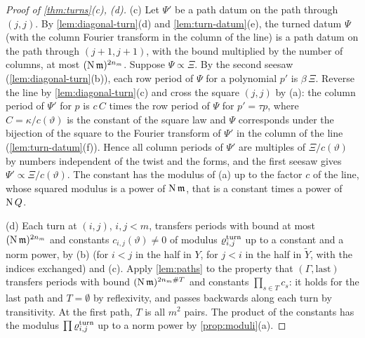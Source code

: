 \begin{proof}[Proof of \cref{thm:turns}(c), (d)]
(c) Let $\Psi'$ be a path datum on the path through $(j,j)$. By \cref{lem:diagonal-turn}(d) and \cref{lem:turn-datum}(e), the turned datum $\Psi$ (with the column Fourier transform in the column of the line) is a path datum on the path through
$(j+1,j+1)$, with the bound multiplied by the number of columns, at most $(\operatorname{N}\mathfrak m)^{2n_m}$. Suppose $\Psi\propto\Xi$. By the second seesaw (\cref{lem:diagonal-turn}(b)), each row period of $\Psi$ for a polynomial $p'$ is $\beta\,\Xi$. Reverse the
line by \cref{lem:diagonal-turn}(c) and cross the square $(j,j)$ by (a): the column period of $\Psi'$ for $p$ is $c\,C$ times the row period of $\Psi$ for $p'=\tau p$, where $C=\kappa/c(\vartheta)$ is the constant of the square law and $\Psi$
corresponds under the bijection of the square to the Fourier transform of $\Psi'$ in the column of the line (\cref{lem:turn-datum}(f)). Hence all column periods of $\Psi'$ are multiples of $\Xi/c(\vartheta)$ by numbers independent of the twist and
the forms, and the first seesaw gives $\Psi'\propto\Xi/c(\vartheta)$. The constant has the modulus of (a) up to the factor $c$ of the line, whose squared modulus is a power of $\operatorname{N}\mathfrak m$, that is a constant times a power of $\operatorname{N} Q$.

(d) Each turn at $(i,j)$, $i,j<m$, transfers periods with bound at most $(\operatorname{N}\mathfrak m)^{2n_m}$ and constants $c_{i,j}(\vartheta)\ne0$ of modulus $\varrho^{\rm turn}_{i,j}$ up to a constant and a norm power, by (b) (for $i<j$ in the half in $Y$, for
$j<i$ in the half in $\tilde Y$, with the indices exchanged) and (c). Apply \cref{lem:paths} to the property that $(\Gamma,\text{last})$ transfers periods with bound $(\operatorname{N}\mathfrak m)^{2n_m\#T}$ and constants $\prod_{s\in T}c_s$: it holds for the last path
and $T=\emptyset$ by reflexivity, and passes backwards along each turn by transitivity. At the first path, $T$ is all $m^2$ pairs. The product of the constants has the modulus $\prod\varrho^{\rm turn}_{i,j}$ up to a norm power by
\cref{prop:moduli}(a).
\end{proof}

